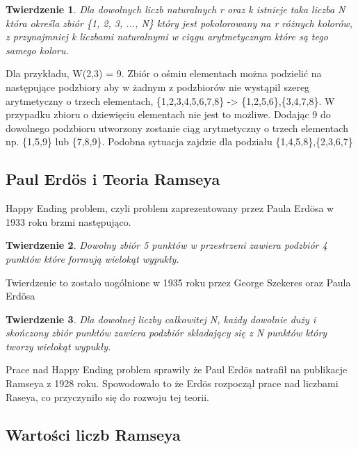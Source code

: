 \documentclass[11pt]{article}
\newtheorem{theorem}{Twierdzenie}
\begin{document}
\begin{theorem}
Dla dowolnych liczb naturalnych r oraz k istnieje taka liczba N która określa zbiór \{1, 2, 3, ..., N\} który jest pokolorowany na r różnych kolorów, z przynajmniej k liczbami naturalnymi w ciągu arytmetycznym które są tego samego koloru.\cite{theory} 
\end{theorem}

Dla przykładu, W(2,3) = 9. Zbiór o ośmiu elementach można podzielić na następujące podzbiory aby w żadnym z podzbiorów nie wystąpił szereg arytmetyczny o trzech elementach, \{1,2,3,4,5,6,7,8\} -> \{1,2,5,6\},\{3,4,7,8\}. W przypadku zbioru o dziewięciu elementach nie jest to możliwe. Dodając 9 do dowolnego podzbioru utworzony zostanie ciąg arytmetyczny o trzech elementach np. \{1,5,9\} lub \{7,8,9\}. Podobna sytuacja zajdzie dla podziału \{1,4,5,8\},\{2,3,6,7\}

\subsection{Paul Erd\"os i Teoria Ramseya}

Happy Ending problem, czyli problem zaprezentowany przez Paula Erd\"osa w 1933 roku brzmi następująco. 

\begin{theorem}
Dowolny zbiór 5 punktów w przestrzeni zawiera podzbiór 4 punktów które formują wielokąt wypukły.
\end{theorem}

Twierdzenie to zostało uogólnione w 1935 roku przez George Szekeres oraz Paula Erd\"osa

\begin{theorem}
Dla dowolnej liczby całkowitej N, każdy dowolnie duży i skończony zbiór punktów zawiera podzbiór składający się z N punktów który tworzy wielokąt wypukły. \cite{erdoshappy} 
\end{theorem}

Prace nad Happy Ending problem sprawiły że Paul Erd\"os natrafił na publikacje Ramseya z 1928 roku. Spowodowało to że Erd\"os rozpoczął prace nad liczbami Raseya, co przyczyniło się do rozwoju tej teorii.

\subsection{Wartości liczb Ramseya}
\end{document}
